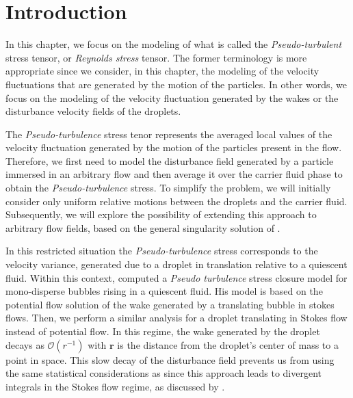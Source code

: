 
\section{Introduction}


In this chapter, we focus on the modeling of what is called the \textit{Pseudo-turbulent} stress tensor, or \textit{Reynolds stress} tensor. 
The former terminology is more appropriate since we consider, in this chapter, the modeling of the velocity fluctuations that are generated by the motion of the particles. 
In other words, we focus on the modeling of the velocity fluctuation generated by the wakes or the disturbance velocity fields of the droplets. 


The \textit{Pseudo-turbulence} stress tenor represents the averaged local values of the velocity fluctuation generated by the motion of the particles present in the flow. 
Therefore, we first need to model the disturbance field generated by a particle immersed in an arbitrary flow and then average it over the carrier fluid phase to obtain the \textit{Pseudo-turbulence} stress. 
To simplify the problem, we will initially consider only uniform relative motions between the droplets and the carrier fluid. 
Subsequently, we will explore the possibility of extending this approach to arbitrary flow fields, based on the general singularity solution of \citet{kim2013microhydrodynamics}. 

In this restricted situation the \textit{Pseudo-turbulence} stress corresponds to the velocity variance, generated due to a droplet in translation relative to a quiescent fluid.
Within this context, \citet{van1998pseudo} computed a \textit{Pseudo turbulence} stress closure model for mono-disperse bubbles rising in a quiescent fluid. 
His model is based on the potential flow solution of the wake generated by a translating bubble in stokes flows.
Then, we perform a similar analysis for a droplet translating in Stokes flow instead of potential flow. In this regime, the wake generated by the droplet decays as $\mathcal{O}(r^{-1})$ with $\textbf{r}$ is the distance from the droplet's center of mass to a point in space. 
This slow decay of the disturbance field prevents us from using the same statistical considerations as \citet{van1998pseudo}  since this approach leads to divergent integrals in the Stokes flow regime, as discussed by \citet{caflisch1985variance}. 


